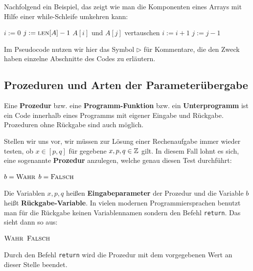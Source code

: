 \begin{bsp} 
Nachfolgend ein Beispiel, das zeigt wie man die Komponenten eines Arrays mit Hilfe einer while-Schleife umkehren kann:
\begin{center}
	\begin{algorithmic}[1]
		\STATE $i:=0$
		\STATE $j:=\mathop{\text{\textsc{len}}}[A]-1$
		\STATE $A[i]$ und $A[j]$ vertauschen 
		\STATE $i:=i+1$ 
		\STATE $j:=j-1$ 
		\ENDWHILE
	\end{algorithmic}
\end{center}
\end{bsp} 

\begin{bem} 
Im Pseudocode nutzen wir hier das Symbol $\triangleright$ für Kommentare, die den Zweck haben einzelne Abschnitte des Codes zu erläutern.
\end{bem} 


\subsection{Prozeduren und Arten der Parameterübergabe}
\label{sect:prozeduren}

\begin{defn}
Eine \textbf{Prozedur} bzw. eine \textbf{Programm-Funktion} bzw. ein \textbf{Unterprogramm} ist ein Code innerhalb eines Programms mit eigener Eingabe und Rückgabe. Prozeduren ohne Rückgabe sind auch möglich. 
\end{defn} 

\begin{bem} 
Stellen wir uns vor, wir müssen zur Lösung einer Rechenaufgabe immer wieder testen, ob $ x \in [p,q]$ für gegebene $x,p,q \in \mathbb{Z}$ gilt. In diesem Fall lohnt es sich, eine sogenannte \textbf{Prozedur} anzulegen, welche genau diesen Test durchführt:

\begin{algorithm}[H]
	\caption{$b=\cc{Ist-zwischen}(x,p,q)$}
	\begin{algorithmic}
		\STATE $b=\mathop{\text{\textsc{Wahr}}}$
		\ELSE
		\STATE $b=\mathop{\text{\textsc{Falsch}}}$
		\ENDIF
	\end{algorithmic}
\end{algorithm}

Die Variablen $x,p,q$ heißen \textbf{Eingabeparameter} der Prozedur und die Variable $b$ heißt \textbf{Rückgabe-Variable}. In vielen modernen Programmiersprachen benutzt man für die Rückgabe keinen Variablennamen sondern den Befehl \texttt{return}. Das sieht dann so aus: 

\begin{algorithm}[H]
	\caption{$\cc{Ist-zwischen}(x,p,q)$}
	\begin{algorithmic}
		\IF{$p \le x \le q$}
		\RETURN $\mathop{\text{\textsc{Wahr}}}$
		\ENDIF
		\RETURN $\mathop{\text{\textsc{Falsch}}}$
	\end{algorithmic}
\end{algorithm}
Durch den Befehl \texttt{return} wird die Prozedur mit dem vorgegebenen Wert an dieser Stelle beendet.
\end{bem} 


